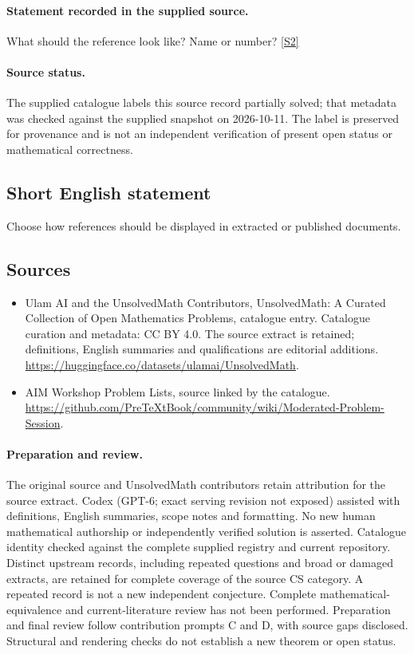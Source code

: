 \documentclass[11pt]{article}
\begin{document}
\paragraph{Statement recorded in the supplied source.}
What should the reference look like? Name or number? \href{https://github.com/PreTeXtBook/community/wiki/Moderated-Problem-Session}{[S2]}
\paragraph{Source status.}
The supplied catalogue labels this source record partially solved; that metadata was checked against the supplied snapshot on 2026-10-11. The label is preserved for provenance and is not an independent verification of present open status or mathematical correctness.
\subsection{Short English statement}
Choose how references should be displayed in extracted or published documents.
\subsection{Sources}
\begin{itemize}
\item[S1] Ulam AI and the UnsolvedMath Contributors, UnsolvedMath: A Curated Collection of Open Mathematics Problems, catalogue entry. Catalogue curation and metadata: CC BY 4.0. The source extract is retained; definitions, English summaries and qualifications are editorial additions.
\url{https://huggingface.co/datasets/ulamai/UnsolvedMath}.
\item[S2] AIM Workshop Problem Lists, source linked by the catalogue.
\url{https://github.com/PreTeXtBook/community/wiki/Moderated-Problem-Session}.
\end{itemize}
\paragraph{Preparation and review.}
The original source and UnsolvedMath contributors retain attribution for the source extract. Codex (GPT-6; exact serving revision not exposed) assisted with definitions, English summaries, scope notes and formatting. No new human mathematical authorship or independently verified solution is asserted. Catalogue identity checked against the complete supplied registry and current repository. Distinct upstream records, including repeated questions and broad or damaged extracts, are retained for complete coverage of the source CS category. A repeated record is not a new independent conjecture. Complete mathematical-equivalence and current-literature review has not been performed. Preparation and final review follow contribution prompts C and D, with source gaps disclosed. Structural and rendering checks do not establish a new theorem or open status.
\label{end:statement}
\end{document}
